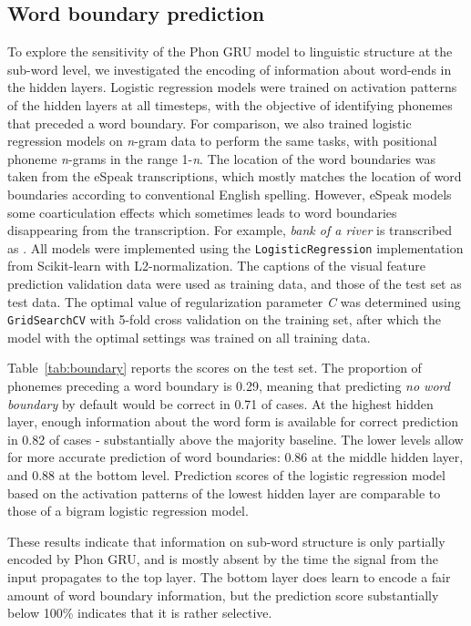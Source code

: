 
\subsection{Word boundary prediction}
To explore the sensitivity of the {\sc Phon GRU} model to linguistic structure at the sub-word level, we investigated the encoding of information about word-ends in the hidden layers. Logistic regression models were trained on activation patterns of the hidden layers at all timesteps, with the objective of identifying phonemes that preceded a word boundary. For comparison, we also trained logistic regression models on \textit{n}-gram data to perform the same tasks, with positional phoneme \textit{n}-grams in the range 1-\textit{n}. The location of the word boundaries was taken from the eSpeak transcriptions, which mostly matches the location of word boundaries according to conventional English spelling. However, eSpeak models some coarticulation effects which sometimes leads to word boundaries disappearing from the transcription. For example, {\it bank of a river} is transcribed as .
All models were implemented using the {\tt LogisticRegression} implementation from Scikit-learn \citep{scikit-learn} with L2-normalization. The captions of the visual feature prediction validation data were used as training data, and those of the test set as test data. The optimal value of regularization parameter \textit{C} was determined using {\tt GridSearchCV} with 5-fold cross validation on the training set, after which the model with the optimal settings was trained on all training data.

Table~\ref{tab:boundary} reports the scores on the test set. The proportion of phonemes preceding a word boundary is 0.29, meaning that predicting {\it no word boundary} by default would be correct in 0.71 of cases. At the highest hidden layer, enough information about the word form is available for correct prediction in 0.82 of cases - substantially above the majority baseline. The lower levels allow for more accurate prediction of word boundaries: 0.86 at the middle hidden layer, and 0.88 at the bottom level.
Prediction scores of the logistic regression model based on the activation patterns of the lowest hidden layer are comparable to those of a bigram logistic regression model.

These results indicate that information on sub-word structure is only partially encoded by {\sc Phon GRU}, and is mostly absent by the time the signal from the input propagates to the top layer. The bottom layer does learn to encode a fair amount of word boundary information, but the prediction score substantially below 100\% indicates that it is rather selective. 

